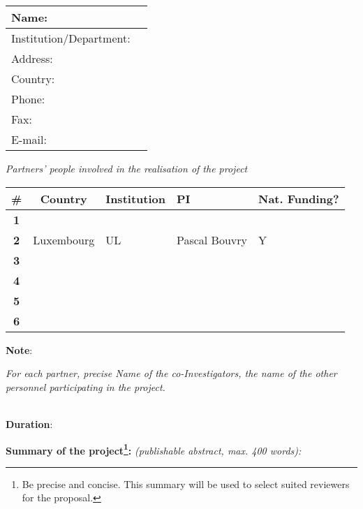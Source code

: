 \documentclass[11pt,twoside,a4paper]{article}
\begin{document}
\begin{table}[H]
    \centering\small
    \begin{tabular}{|p{}|p{}|}
        \hline
        Name:                   & \\\hline
        Institution/Department: & \\\hline
        Address:                & \\\hline
        Country:                & \\\hline
        Phone:                  & \\\hline
        Fax:                    & \\\hline
        E-mail:                 & \\\hline
        \hline
    \end{tabular}
\end{table}

\emph{Partners' people involved in the realisation of the project }

\begin{table}[H]
    \centering\small
    \begin{tabular}{|c|c|p{}|p{}|p{}|}
        \hline
        \rowcolor{lightgray}
        \textbf{\#} & \textbf{Country} & \textbf{Institution} & \textbf{PI} & \textbf{Nat. Funding?}\\\hline
        \hline 
        \textbf{1}  & & & &\\\hline
        \textbf{2}  & Luxembourg & \acf{UL} & Pascal Bouvry & Y \\\hline
        \textbf{3}  & & & &\\\hline
        \textbf{4}  & & & &\\\hline
        \textbf{5}  & & & &\\\hline
        \textbf{6}  & & & &\\\hline
        \hline
    \end{tabular}
\end{table}
\textbf{Note}:

\emph{For each partner, precise Name of the co-Investigators, the name of the
  other personnel participating in the project.} 

~\\[2em]
\textbf{Duration}: 

\textbf{Summary of the project\footnote{Be precise and concise. This summary will be used to select suited reviewers for the proposal.}:} \emph{(publishable abstract, max. 400 words):}

\end{document}
